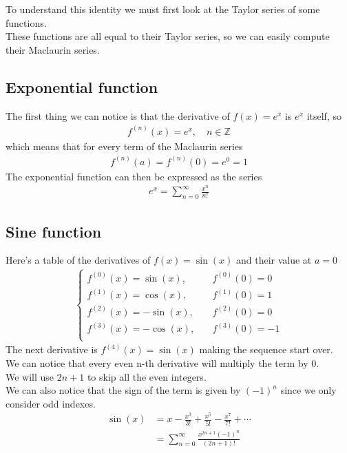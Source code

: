 \documentclass{article}
\begin{document}
To understand this identity we must first look at the Taylor series of some functions.
\\
These functions are all equal to their Taylor series, so we can easily compute their Maclaurin series.

\subsection{Exponential function}

The first thing we can notice is that the derivative of \(f(x)=e^x\) is \(e^x\) itself, so
\begin{align*}
	f^{(n)}(x)=e^x,
	\quad n\in\mathbb{Z}
\end{align*}
which means that for every term of the Maclaurin series
\begin{align*}
	f^{(n)}(a)=f^{(n)}(0)=e^0=1
\end{align*}
The exponential function can then be expressed as the series
\begin{align*}
	e^x=\sum_{n=0}^{\infty}\frac{x^n}{n!}
\end{align*}

\pagebreak

\subsection{Sine function}

Here's a table of the derivatives of \(f(x)=\sin(x)\) and their value at \(a=0\)
\begin{align*}
	\begin{cases}
		f^{(0)}(x)=\sin(x), \quad &f^{(0)}(0)=0 \\
		f^{(1)}(x)=\cos(x), \quad &f^{(1)}(0)=1 \\
		f^{(2)}(x)=-\sin(x),\quad &f^{(2)}(0)=0 \\
		f^{(3)}(x)=-\cos(x),\quad &f^{(3)}(0)=-1\\
	\end{cases}
\end{align*}
The next derivative is \(f^{(4)}(x)=\sin(x)\) making the sequence start over.
\\
We can notice that every even n-th derivative will multiply the term by \(0\).
\\
We will use \(2n+1\) to skip all the even integers.
\\
We can also notice that the sign of the term is given by \({(-1)}^n\) since we only consider odd indexes.
\begin{align*}
	\sin(x)&=x-\frac{x^3}{3!}+\frac{x^5}{5!}-\frac{x^7}{7!}+\cdots
	\\
	&=\sum_{n=0}^{\infty}\frac{x^{2n+1}{(-1)}^n}{(2n+1)!}
\end{align*}
\end{document}
